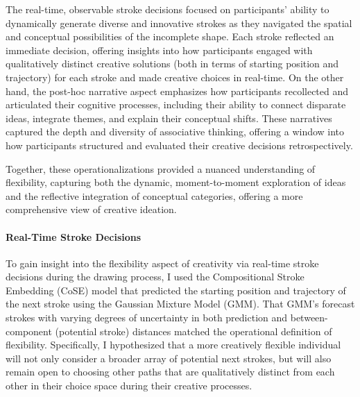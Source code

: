 \documentclass[../MA_Thesis.tex]{subfiles}
\begin{document}
The real-time, observable stroke decisions focused on participants’ ability to dynamically generate diverse and innovative strokes as they navigated the spatial and conceptual possibilities of the incomplete shape. Each stroke reflected an immediate decision, offering insights into how participants engaged with qualitatively distinct creative solutions (both in terms of starting position and trajectory) for each stroke and made creative choices in real-time. On the other hand, the post-hoc narrative aspect emphasizes how participants recollected and articulated their cognitive processes, including their ability to connect disparate ideas, integrate themes, and explain their conceptual shifts. These narratives captured the depth and diversity of associative thinking, offering a window into how participants structured and evaluated their creative decisions retrospectively.

Together, these operationalizations provided a nuanced understanding of flexibility, capturing both the dynamic, moment-to-moment exploration of ideas and the reflective integration of conceptual categories, offering a more comprehensive view of creative ideation.

\paragraph*{Real-Time Stroke Decisions}
To gain insight into the flexibility aspect of creativity via real-time stroke decisions during the drawing process, I used the Compositional Stroke Embedding (CoSE) model that predicted the starting position and trajectory of the next stroke using the Gaussian Mixture Model (GMM). That GMM's forecast strokes with varying degrees of uncertainty in both prediction and between-component (potential stroke) distances matched the operational definition of flexibility. Specifically, I hypothesized that a more creatively flexible individual will not only consider a broader array of potential next strokes, but will also remain open to choosing other paths that are qualitatively distinct from each other in their choice space during their creative processes.
\end{document}
